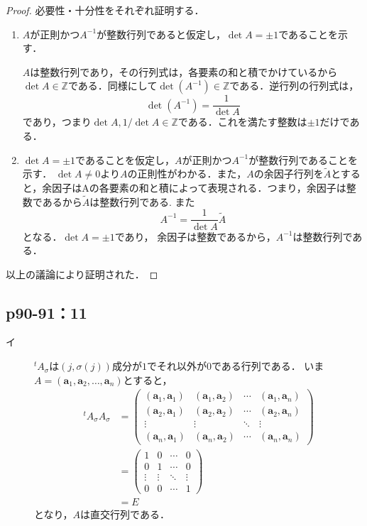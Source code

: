 \documentclass[uplatex,dvipdfmx,a4paper,11pt,fleqn]{jsarticle}
\begin{document}
\begin{leftbar}
\begin{proof}
必要性・十分性をそれぞれ証明する．
\begin{enumerate}
\item $A$が正則かつ$A^{-1}$が整数行列であると仮定し，$\det A=\pm 1$であることを示す．

$A$は整数行列であり，その行列式は，各要素の和と積でかけているから$\det A \in \mathbb{Z}$である．同様にして$\det (A^{-1}) \in \mathbb{Z}$である．逆行列の行列式は，
\[
\det (A^{-1})=\frac{1}{\det A}
\]
であり，つまり$\det A,1/\det A \in \mathbb{Z}$である．これを満たす整数は$\pm 1$だけである．
\item $\det A=\pm 1$であることを仮定し，$A$が正則かつ$A^{-1}$が整数行列であることを示す．
$\det A \neq 0$より$A$の正則性がわかる．また，$A$の余因子行列を$\tilde{A}$とすると，余因子はAの各要素の和と積によって表現される．つまり，余因子は整数であるから$\tilde{A}$は整数行列である. また
\[
A^{-1}=\frac{1}{\det A}\tilde{A}
\]
となる．$\det A=\pm 1$であり， 余因子は整数であるから，$A^{-1}$は整数行列である．
\end{enumerate}
以上の議論により証明された．
\end{proof}
\end{leftbar}

\newpage 

\subsection*{p90-91：11}
\begin{tleftbar}
    \begin{description}
        \item[イ] ${}^t A_\sigma$は$(j,\sigma(j))$成分が$1$でそれ以外が$0$である行列である．
        いま$A = (\bm{a}_1,\bm{a}_2,\ldots,\bm{a}_n)$とすると，
        \begin{align*}
            {}^t A_\sigma A_\sigma &= 
            \begin{pmatrix} 
                (\bm{a}_1,\bm{a}_1) & (\bm{a}_1,\bm{a}_2) & \cdots & (\bm{a}_1,\bm{a}_n) \\ 
                (\bm{a}_2,\bm{a}_1) & (\bm{a}_2,\bm{a}_2) & \cdots & (\bm{a}_2,\bm{a}_n) \\
                \vdots & \vdots & \ddots & \vdots \\
                (\bm{a}_n,\bm{a}_1) & (\bm{a}_n,\bm{a}_2) & \cdots & (\bm{a}_n,\bm{a}_n)
            \end{pmatrix}
            \\
            & = \begin{pmatrix} 1 & 0 & \cdots & 0 \\ 0 & 1 & \cdots & 0 \\ \vdots & \vdots & \ddots & \vdots \\ 0 & 0 & \cdots & 1 \end{pmatrix} \\
            &= E
        \end{align*}
        となり，$A$は直交行列である．
    \end{description}
\end{tleftbar}
\end{document}
